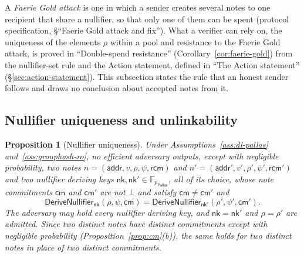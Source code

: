 \documentclass[11pt,a4paper]{article}
\newtheorem{proposition}[theorem]{Proposition}
\theoremstyle{definition}
\newcommand{\F}{\mathbb{F}}
\newcommand{\cmsym}{\mathsf{cm}}
\newcommand{\Pallas}{\ensuremath{\mathsf{Pallas}}}
\newcommand{\nksym}{\ensuremath{\mathsf{nk}}}
\newcommand{\rcm}{\ensuremath{\mathsf{rcm}}}
\begin{document}
A \emph{Faerie Gold attack} is one in which a sender creates several notes to
one recipient that share a nullifier, so that only one of them can be spent
(protocol specification, \S``Faerie Gold attack and fix''). What a verifier
can rely on, the uniqueness of the elements $\rho$ within a pool and
resistance to the Faerie Gold attack, is proved in ``Double-spend
resistance'' (Corollary~\ref{cor:faerie-gold}) from the nullifier-set rule
and the Action statement, defined in ``The Action statement''
(\S\ref{sec:action-statement}). This subsection states the rule that an
honest sender follows and draws no conclusion about accepted notes from it.

\subsection{Nullifier uniqueness and unlinkability}\label{sec:nf-props}

\begin{proposition}[Nullifier uniqueness]\label{prop:nf-unique}
Under Assumptions~\ref{ass:dl-pallas} and~\ref{ass:grouphash-ro}, no
efficient adversary outputs, except with negligible probability, two notes
$n = (\mathsf{addr}, v, \rho, \psi, \rcm)$ and
$n' = (\mathsf{addr}', v', \rho', \psi', \rcm')$ and two nullifier deriving
keys $\nksym, \nksym' \in \F_{p_{\Pallas}}$, all of its choice, whose note
commitments $\cmsym$ and $\cmsym'$ are not $\bot$ and satisfy
$\cmsym \neq \cmsym'$ and
\[
  \mathsf{DeriveNullifier}_{\nksym}(\rho, \psi, \cmsym) =
  \mathsf{DeriveNullifier}_{\nksym'}(\rho', \psi', \cmsym').
\]
The adversary may hold every nullifier deriving key, and $\nksym = \nksym'$
and $\rho = \rho'$ are admitted. Since two distinct notes have distinct
commitments except with negligible probability
(Proposition~\ref{prop:cm}(b)), the same holds for two distinct notes in
place of two distinct commitments.
\end{proposition}
\end{document}
